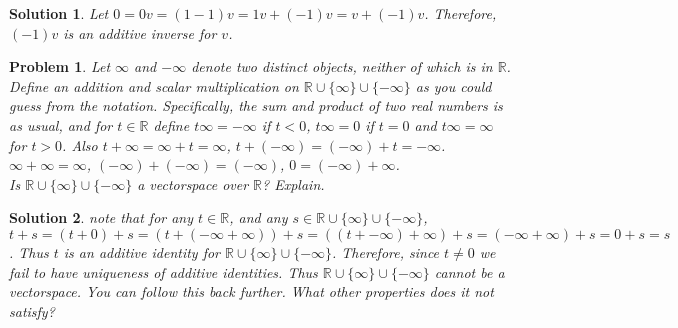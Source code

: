 \documentclass{article}
\theoremstyle{problemstyle}
\newtheorem{problem}{Problem}
\theoremstyle{problemstyle}
\newtheorem{solution}{Solution}
\begin{document}
\begin{solution}
Let $0 = 0v = (1-1)v = 1v + (-1)v = v+(-1)v$. Therefore, $(-1)v$ is an additive inverse for $v$. 
\end{solution}

\begin{problem}
Let $\infty$ and $-\infty$ denote two distinct objects, neither of which is in $\mathbb{R}$. Define an addition and scalar multiplication on $\mathbb{R}\cup \{\infty\}\cup \{-\infty\}$ as you could guess from the notation. Specifically, the sum and product of two real numbers is as usual, and for $t \in \mathbb{R}$ define $t\infty
 = -\infty$ if $t < 0$, $t\infty = 0$ if $t = 0$ and $t\infty = \infty$ for $t>0$. Also $t+\infty = \infty +t =  \infty$, $t+(-\infty) = (-\infty) +t =-\infty$. $\infty+\infty =\infty$, $(-\infty)+(-\infty) =(-\infty)$, $0 = (-\infty)+\infty$.\\
Is $\mathbb{R}\cup \{\infty\}\cup \{-\infty\}$ a vectorspace over $\mathbb{R}$? Explain.
 \end{problem}
 \begin{solution}
 note that for any $t \in \mathbb{R}$, and any $s \in \mathbb{R}\cup \{\infty\}\cup \{-\infty\}$,   $t + s = (t+0) + s = (t + (-\infty + \infty)) + s =  ((t + -\infty) + \infty) + s = (-\infty + \infty) + s = 0 + s = s$. Thus $t$ is an additive identity for $\mathbb{R}\cup \{\infty\}\cup \{-\infty\}$. Therefore, since $t \neq 0$ we fail to have uniqueness of additive identities. Thus $\mathbb{R}\cup \{\infty\}\cup \{-\infty\}$ cannot be a vectorspace. You can follow this back further. What other properties does it not satisfy?
 \end{solution}
\end{document}

